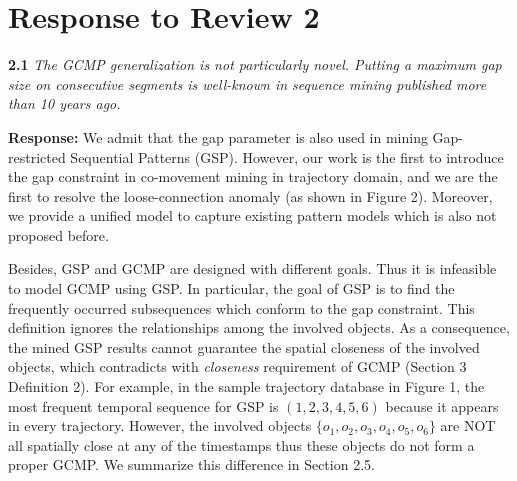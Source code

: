 \section{Response to Review 2}

\textbf{2.1} \emph{The GCMP generalization is not particularly novel. Putting a maximum gap size
on consecutive segments is well-known
in sequence mining published more than
10 years ago.}

\textbf{Response:} We admit that the gap parameter
is also used in mining Gap-restricted Sequential Patterns (GSP). 
However, our work is the first to introduce the gap constraint 
in co-movement mining in trajectory domain, and we are the first to resolve the
loose-connection anomaly (as shown in Figure 2).  
Moreover, we provide
a unified model to capture existing pattern models which 
is also not proposed before.
%

%
%
%
%

Besides, GSP and GCMP are designed with different goals. Thus it is infeasible
to model GCMP using GSP. 
In particular, the goal of GSP 
is to find the frequently occurred subsequences which conform to the gap constraint.
This definition ignores the relationships among the involved objects. 
As a consequence, the mined GSP results cannot guarantee the spatial closeness of the involved
objects, which contradicts with \emph{closeness} requirement of GCMP (Section 3 Definition 2). 
For example, in the sample trajectory database in Figure 1, 
the most frequent temporal sequence for GSP is
$(1,2,3,4,5,6)$ because it appears in every trajectory. 
However, the involved objects $\{o_1,o_2,o_3,o_4,o_5,o_6\}$ are NOT all
spatially close at any of the timestamps thus these objects do not form a proper GCMP.
We summarize this difference in Section 2.5.

